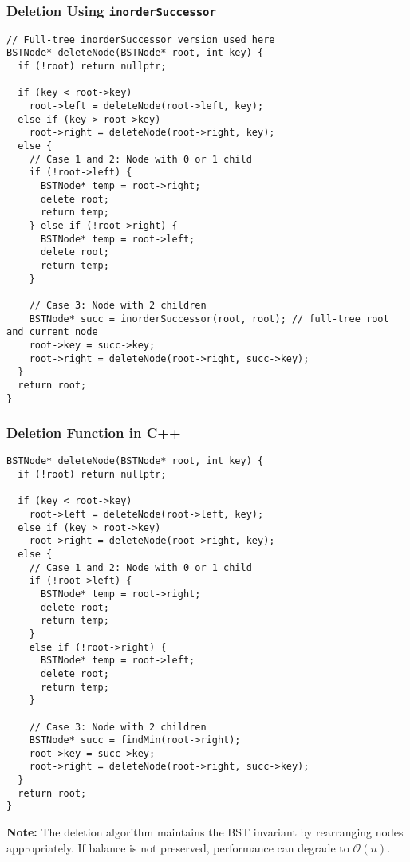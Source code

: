 \documentclass{article}
\begin{document}
\subsubsection*{Deletion Using \texttt{inorderSuccessor}}

\begin{lstlisting}[style=cppstyle]
// Full-tree inorderSuccessor version used here
BSTNode* deleteNode(BSTNode* root, int key) {
  if (!root) return nullptr;

  if (key < root->key)
    root->left = deleteNode(root->left, key);
  else if (key > root->key)
    root->right = deleteNode(root->right, key);
  else {
    // Case 1 and 2: Node with 0 or 1 child
    if (!root->left) {
      BSTNode* temp = root->right;
      delete root;
      return temp;
    } else if (!root->right) {
      BSTNode* temp = root->left;
      delete root;
      return temp;
    }

    // Case 3: Node with 2 children
    BSTNode* succ = inorderSuccessor(root, root); // full-tree root and current node
    root->key = succ->key;
    root->right = deleteNode(root->right, succ->key);
  }
  return root;
}
\end{lstlisting}




\subsubsection*{Deletion Function in C++}

\begin{lstlisting}[style=cppstyle]
BSTNode* deleteNode(BSTNode* root, int key) {
  if (!root) return nullptr;

  if (key < root->key)
    root->left = deleteNode(root->left, key);
  else if (key > root->key)
    root->right = deleteNode(root->right, key);
  else {
    // Case 1 and 2: Node with 0 or 1 child
    if (!root->left) {
      BSTNode* temp = root->right;
      delete root;
      return temp;
    }
    else if (!root->right) {
      BSTNode* temp = root->left;
      delete root;
      return temp;
    }

    // Case 3: Node with 2 children
    BSTNode* succ = findMin(root->right);
    root->key = succ->key;
    root->right = deleteNode(root->right, succ->key);
  }
  return root;
}
\end{lstlisting}

\textbf{Note:} The deletion algorithm maintains the BST invariant by rearranging nodes appropriately. If balance is not preserved, performance can degrade to $\mathcal{O}(n)$.
\end{document}
